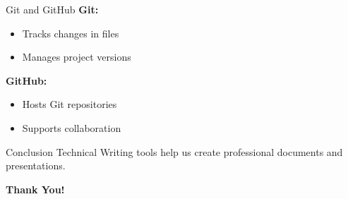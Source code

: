 \documentclass{beamer}
\begin{document}
\begin{frame}{Git and GitHub}
    \textbf{Git:}
    \begin{itemize}
        \item Tracks changes in files
        \item Manages project versions
    \end{itemize}

    \textbf{GitHub:}
    \begin{itemize}
        \item Hosts Git repositories
        \item Supports collaboration
    \end{itemize}
\end{frame}

\begin{frame}{Conclusion}
    Technical Writing tools help us create
    professional documents and presentations.

    \begin{center}
        \textbf{Thank You!}
    \end{center}
\end{frame}
\end{document}
